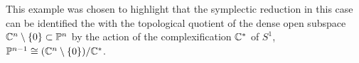 This example was chosen to highlight that the symplectic reduction in this case can be identified the with the topological quotient of the dense open subspace $\mathbb{C}^{n} \setminus \{0\} \subset \mathbb{P}^{n}$ by the action of the complexification $\mathbb{C}^{\ast}$ of $S^{1}$, \ie $\mathbb{P}^{n-1} \cong (\mathbb{C}^{n} \setminus \{0\})/\mathbb{C}^{\ast}$.





